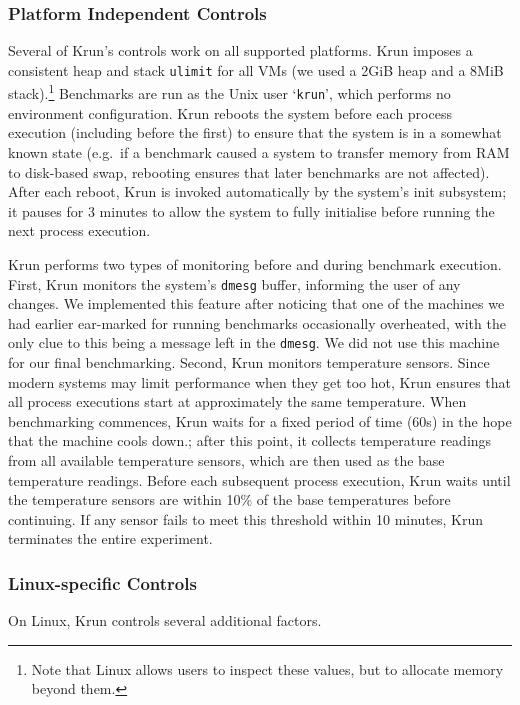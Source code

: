 \documentclass[a4paper,UKenglish]{lipics}
\newcommand{\krun}{Krun\xspace}
\begin{document}
\subsubsection{Platform Independent Controls}

Several of \krun's controls work on all supported platforms. \krun imposes a
consistent heap and stack \texttt{ulimit} for all
VMs (we used a 2GiB heap and a 8MiB stack).\footnote{Note that Linux allows users
to inspect these values, but to allocate memory beyond them.} Benchmarks are run
as the Unix user `\texttt{krun}', which performs no environment configuration.
\krun reboots the system before each process execution (including
before the first) to ensure that the system is in a somewhat known state
(e.g.~if a benchmark caused a system to transfer memory from RAM to disk-based swap,
rebooting ensures that later benchmarks are not affected). After each reboot, \krun
is invoked automatically by the system's init subsystem; it pauses for 3 minutes to allow the system
to fully initialise before running the next process execution.

\krun performs two types of monitoring before and during benchmark execution.
First, \krun monitors the system's \texttt{dmesg} buffer, informing the user of
any changes. We implemented this feature after noticing that one of the
machines we had earlier ear-marked for running benchmarks occasionally
overheated, with the only clue to this being a message left in the \texttt{dmesg}.
We did not use this machine for our final benchmarking.
Second, \krun monitors temperature sensors. Since modern systems may limit
performance when they get too hot, \krun ensures that all process executions
start at approximately the same temperature. When benchmarking commences,
\krun waits for a fixed period of time (60s) in the hope that the machine
cools down.; after this point, it collects temperature
readings from all available temperature sensors, which are then used as
the base temperature readings. Before each subsequent process execution, \krun
waits until the temperature sensors are within 10\%{} of the base temperatures
before continuing. If any sensor fails to meet this threshold
within 10 minutes, \krun terminates the entire experiment.


\subsubsection{Linux-specific Controls}

On Linux, \krun controls several additional factors.
\end{document}
